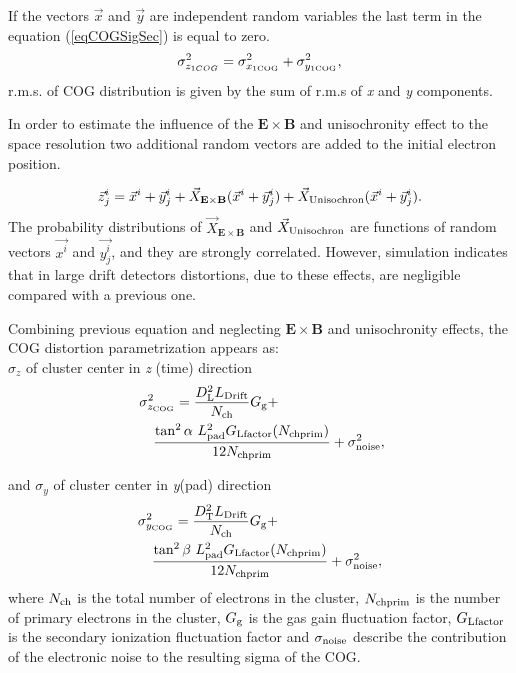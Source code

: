 \documentclass[a4paper,12pt]{article}
\begin{document}
If the vectors $\vec{x}$ and $\vec{y}$ are independent random
variables the last term in the equation (\ref{eqCOGSigSec}) is
equal to zero.
\begin{eqnarray}
    \sigma_{z_{1COG}}^2=\sigma_{x_{\rm{1COG}}}^2+
    \sigma_{y_{\rm{1COG}}}^2,
\label{eqCOGSigSecIn}
\end{eqnarray}
r.m.s. of COG distribution is given by the sum of r.m.s of
{\it{x}} and {\it{y}} components.

In order to estimate the influence of the $\mathbf{E{\times}B}$
and unisochronity effect to the space resolution  two additional
random vectors are added to the initial electron position.


\begin{eqnarray}
\vec{z}^i_j =\vec{x}^i+\vec{y}^i_j+
        \vec{X}_{\mathbf{E{\times}B}}(\vec{x}^i+\vec{y}^i_j)+
        \vec{X}_{\rm{Unisochron}}(\vec{x}^i+\vec{y}^i_j).
\label{eqZtotplus}
\end{eqnarray}
The probability distributions of $\vec{X}_{\mathbf{E{\times}B}}$
and $\vec{X}_{\rm{Unisochron}}$ are  functions of  random vectors
$\vec{x^i}$ and $\vec{y^i_j}$, and they are strongly correlated.
However, simulation indicates that in large drift detectors
distortions, due to these effects,  are negligible compared with a
previous one.

Combining previous equation and neglecting $\mathbf{E{\times}B}$
and unisochronity
effects, the COG distortion  parametrization appears as:\\
{$\sigma_{z}$} of cluster center in {\it{z}} (time) direction
\begin{eqnarray}\
     \lefteqn{\sigma^2_{{z_{\rm{COG}}}} = \frac{D^2_{\rm{L}}
     L_{\rm{Drift}}}{N_{\rm{ch}}}G_{\rm{g}}+}\nonumber\\&&{}
        \frac{{\tan^2\alpha}~L_{\rm{pad}}^2G_{\rm{Lfactor}}(N_{\rm{chprim}})}{12N_{\rm{chprim}}}+
        \sigma^2_{\rm{noise}},
         \label{eqResZ1}
\end{eqnarray}

and {$\sigma_{y}$} of cluster center in {\it{y}}(pad) direction
    \begin{eqnarray}
     \lefteqn{\sigma^2_{y_{\rm{COG}}} = \frac{D^2_{\rm{T}}L_{\rm{Drift}}}{N_{\rm{ch}}}G_{\rm{g}}+}\nonumber\\&&{}
        \frac{{\tan^2\beta}~L_{\rm{pad}}^2G_{\rm{Lfactor}}(N_{\rm{chprim}})}{12N_{\rm{chprim}}}+
        \sigma^2_{\rm{noise}},
        \label{eqResY1}
    \end{eqnarray}
 where
${N_{\rm{ch}}}$ is the total number of electrons in the cluster,
${N_{\rm{chprim}}}$ is the number of primary electrons in the
cluster, ${G_{\rm{g}}}$ is the gas gain fluctuation factor,
${G_{\rm{Lfactor}}}$ is the secondary ionization fluctuation
factor and $\sigma_{\rm{noise}}$ describe the contribution of the
electronic noise to the resulting sigma of the COG.
\end{document}
